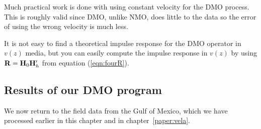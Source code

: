 %
%
%

\par
Much practical work is done with using constant velocity for the DMO process.
This is roughly valid since DMO, unlike NMO, does little
to the data so the error of using the wrong velocity is much less.

\par
It is not easy to find a theoretical impulse response
for the DMO operator in $v(z)$ media,
but you can easily compute the impulse response in $v(z)$
by using $\bold R=\bold H_0\bold H_h'$ from
equation (\ref{eqn:fourR}).

\subsection{Results of our DMO program}
\par
We now return to the field data from the Gulf of Mexico,
which we have processed earlier
in this chapter and in chapter~\ref{paper:vela}.  

